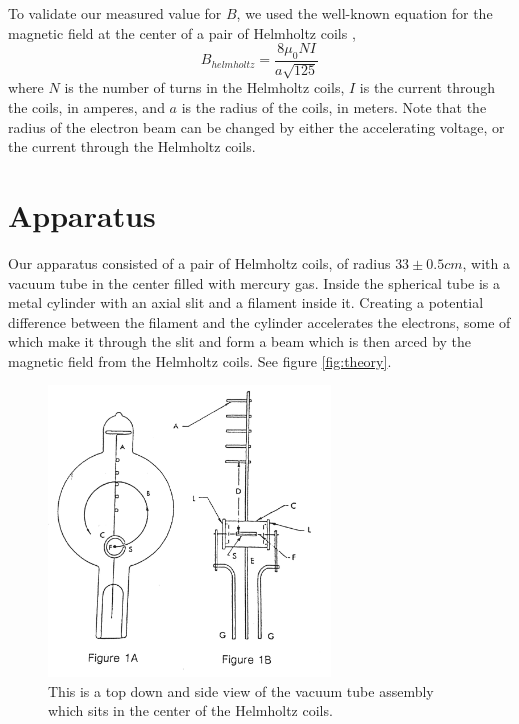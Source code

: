 \documentclass[aps,twocolumn,secnumarabic,amsmath,amssymb,nofootinbib]{revtex4-1}
\begin{document}
To validate our measured value for $B$, we used the well-known equation for the magnetic field at the center of a pair of Helmholtz coils \cite{BHelmholtz}, \cite{detailed_b_helmholtz}
\begin{equation}
	B_{helmholtz} = \frac{8\mu_0NI}{a\sqrt{125}}
\label{eq:b_helmholtz}
\end{equation}
where $N$ is the number of turns in the Helmholtz coils, $I$ is the current through the coils, in amperes, and $a$ is the radius of the coils, in meters. Note that the radius of the electron beam can be changed by either the accelerating voltage, or the current through the Helmholtz coils.

\section{Apparatus}

Our apparatus consisted of a pair of Helmholtz coils, of radius $33 \pm 0.5cm$, with a vacuum tube in the center filled with mercury gas. Inside the spherical tube is a metal cylinder with an axial slit and a filament inside it. Creating a potential difference between the filament and the cylinder accelerates the electrons, some of which make it through the slit and form a beam which is then arced by the magnetic field from the Helmholtz coils. See figure \ref{fig:theory}. \\

\begin{figure}[htb]
\includegraphics[width=7.5cm]{../images/e_over_m_apparatus.png}
\caption{This is a top down and side view of the vacuum tube assembly which sits in the center of the Helmholtz coils.}
\label{fig:apparatus}
\end{figure}
\end{document}
